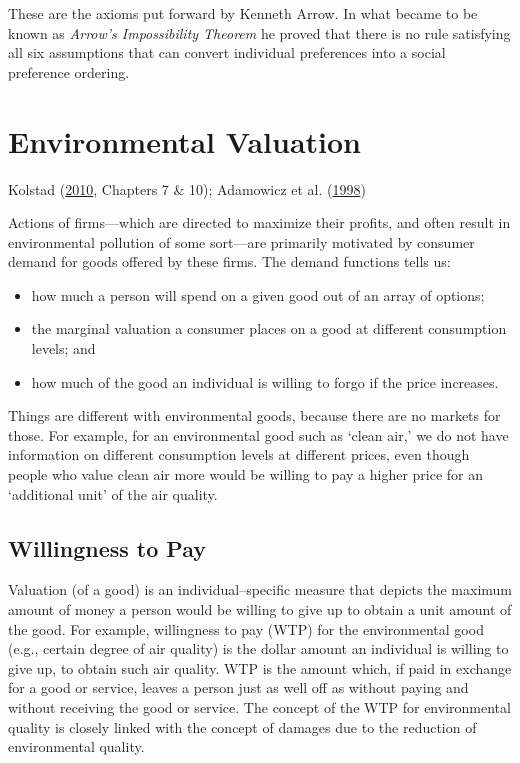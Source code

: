 \documentclass[
]{book}
\providecommand{\tightlist}{%
  \setlength{\itemsep}{0pt}\setlength{\parskip}{0pt}}
\begin{document}
These are the axioms put forward by Kenneth Arrow. In what became to be known as \emph{Arrow's Impossibility Theorem} he proved that there is no rule satisfying all six assumptions that can convert individual preferences into a social preference ordering.

\hypertarget{environmental-valuation}{%
\chapter{Environmental Valuation}\label{environmental-valuation}}

Kolstad (\protect\hyperlink{ref-kolstad2010}{2010}, Chapters 7 \& 10); Adamowicz et al. (\protect\hyperlink{ref-adamowicz1998}{1998})

Actions of firms---which are directed to maximize their profits, and often result in environmental pollution of some sort---are primarily motivated by consumer demand for goods offered by these firms. The demand functions tells us:

\begin{itemize}
\tightlist
\item
  how much a person will spend on a given good out of an array of options;
\item
  the marginal valuation a consumer places on a good at different consumption levels; and
\item
  how much of the good an individual is willing to forgo if the price increases.
\end{itemize}

Things are different with environmental goods, because there are no markets for those. For example, for an environmental good such as `clean air,' we do not have information on different consumption levels at different prices, even though people who value clean air more would be willing to pay a higher price for an `additional unit' of the air quality.

\hypertarget{willingness-to-pay}{%
\section{Willingness to Pay}\label{willingness-to-pay}}

Valuation (of a good) is an individual--specific measure that depicts the maximum amount of money a person would be willing to give up to obtain a unit amount of the good. For example, willingness to pay (WTP) for the environmental good (e.g., certain degree of air quality) is the dollar amount an individual is willing to give up, to obtain such air quality. WTP is the amount which, if paid in exchange for a good or service, leaves a person just as well off as without paying and without receiving the good or service. The concept of the WTP for environmental quality is closely linked with the concept of damages due to the reduction of environmental quality.
\end{document}
